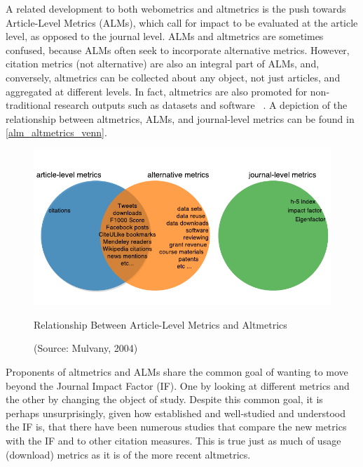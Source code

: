 A related development to both webometrics and altmetrics is the push towards Article-Level Metrics (ALMs), which call for impact to be evaluated at the article level, as opposed to the journal level. ALMs and altmetrics are sometimes confused, because ALMs often seek to incorporate alternative metrics. However, citation metrics (not alternative) are also an integral part of ALMs, and, conversely, altmetrics can be collected about any object, not just articles, and aggregated at different levels. In fact, altmetrics are also promoted for non-traditional research outputs such as datasets and software ~\citep{Piwowar2013a,Piwowar2013d}. A depiction of the relationship between altmetrics, ALMs, and journal-level metrics can be found in \autoref{alm_altmetrics_venn}.



\begin{figure}[htbp]
\centering
\includegraphics[keepaspectratio,width=\textwidth,height=0.75\textheight]{figures/alm_altmetrics_venn.pdf}
\caption{Relationship Between Article-Level Metrics and Altmetrics}
\caption*{(Source: Mulvany, 2004)}
\label{alm_altmetrics_venn}
\end{figure}



Proponents of altmetrics and ALMs share the common goal of wanting to move beyond the Journal Impact Factor (IF). One by looking at different metrics and the other by changing the object of study. Despite this common goal, it is perhaps unsurprisingly, given how established and well-studied and understood the IF is, that there have been numerous studies that compare the new metrics with the IF and to other citation measures. This is true just as much of usage (download) metrics as it is of the more recent altmetrics.

